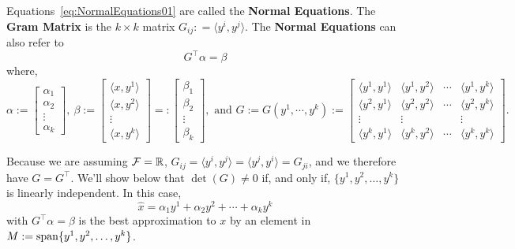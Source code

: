 \begin{definition}
Equations~\ref{eq:NormalEquations01} are called the \textbf{Normal Equations}. The \textbf{Gram Matrix} is the $k \times k$ matrix $G_{ij}: =  \langle y^i,y^j \rangle$. The \textbf{Normal Equations} can also refer to 
\begin{equation}
\label{eq:NormalEquations02}
 G^\top \alpha = \beta
\end{equation}
where,
$$  \alpha:=\begin{bmatrix} \alpha_1 \\ \alpha_2 \\ \vdots \\ \alpha_k  \end{bmatrix}, ~  \beta:=\begin{bmatrix} \langle x,y^1 \rangle \\ \langle x,y^2 \rangle \\ \vdots \\ \langle x,y^k \rangle \end{bmatrix}=:\begin{bmatrix} \beta_1 \\ \beta_2 \\ \vdots \\ \beta_k  \end{bmatrix}, \text{ and } G:=G(y^1,\cdots , y^k):=\left[ \begin{array}{cccc}  \langle y^1,y^1 \rangle  &  \langle y^1,y^2 \rangle  & \cdots &  \langle y^1,y^k \rangle  \\  \langle y^2,y^1 \rangle  &  \langle y^2,y^2 \rangle  & \cdots &  \langle y^2,y^k \rangle \\ \vdots & \vdots && \vdots \\  \langle y^k,y^1 \rangle  &  \langle y^k,y^2 \rangle  & \cdots &  \langle y^k,y^k \rangle  \end{array}  \right].$$

\end{definition}

\begin{rem}
Because we are assuming $\cal F =\mathbb R  $,  $G_{ij}= \langle y^i,y^j \rangle = \langle y^j,y^i \rangle = G_{ji}$, and we therefore have $G=G^\top$. We'll show below that $\det(G) \neq 0$ if, and only if, $\{ y^1, y^2, \ldots, y^k\}$ is linearly independent. In this case, 
$$\widehat{x}= \alpha_1 y^1+ \alpha_2 y^2+ \cdots +\alpha_k y^k$$
with $G^\top \alpha = \beta$ is the best approximation to $x$ by an element in $M:=\mathrm{span} \{  y^1, y^2, \ldots, y^k \}$.
\end{rem}


